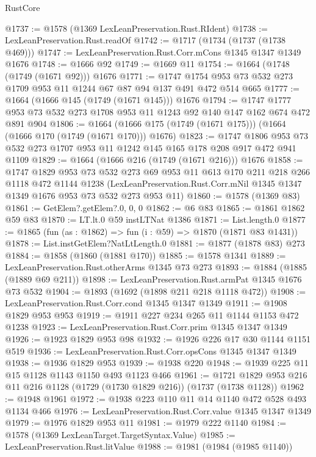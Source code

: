 \begin{lexlean}{RustCore}
\begin{coremodule}
@1737 := @1578 (@1369 LexLeanPreservation.Rust.RIdent)
@1738 := LexLeanPreservation.Rust.readOf
@1742 := @1717 (@1734 (@1737 (@1738 @469)))
@1747 := LexLeanPreservation.Rust.Corr.mCons @1345 @1347 @1349 @1676
@1748 := @1666 @92
@1749 := @1669 @11
@1754 := @1664 (@1748 (@1749 (@1671 @92))) @1676
@1771 := @1747 @1754 @953 @73 @532 @273 @1709 @953 @11 @1244 @67 @87 @94 @137 @491 @472 @514 @665
@1777 := @1664 (@1666 @145 (@1749 (@1671 @145))) @1676
@1794 := @1747 @1777 @953 @73 @532 @273 @1708 @953 @11 @1243 @92 @140 @147 @162 @674 @472 @891 @904
@1806 := @1664 (@1666 @175 (@1749 (@1671 @175))) (@1664 (@1666 @170 (@1749 (@1671 @170))) @1676)
@1823 := @1747
    @1806
    @953
    @73
    @532
    @273
    @1707
    @953
    @11
    @1242
    @145
    @165
    @178
    @208
    @917
    @472
    @941
    @1109
@1829 := @1664 (@1666 @216 (@1749 (@1671 @216))) @1676
@1858 := @1747
    @1829
    @953
    @73
    @532
    @273
    @69
    @953
    @11
    @613
    @170
    @211
    @218
    @266
    @1118
    @472
    @1144
    @1238
    (LexLeanPreservation.Rust.Corr.mNil @1345 @1347 @1349 @1676 @953 @73 @532 @273 @953 @11)
@1860 := @1578 (@1369 @83)
@1861 := GetElem?.getElem?.{0, 0, 0}
@1862 := @6 @83
@1865 := @1861 @1862 @59 @83
@1870 := LT.lt.{0} @59 instLTNat @1386
@1871 := List.length.{0}
@1877 := @1865 (fun (as : @1862) => fun (i : @59) => @1870 (@1871 @83 @1431))
@1878 := List.instGetElem?NatLtLength.{0}
@1881 := @1877 (@1878 @83) @273
@1884 := @1858 (@1860 (@1881 @170))
@1885 := @1578 @1341
@1889 := LexLeanPreservation.Rust.otherArms @1345 @73 @273
@1893 := @1884 (@1885 (@1889 @69 @211))
@1898 := LexLeanPreservation.Rust.armPat @1345 @1676 @73 @532
@1904 := @1893 (@1692 (@1898 @211 @218 @1118 @472))
@1908 := LexLeanPreservation.Rust.Corr.cond @1345 @1347 @1349
@1911 := @1908 @1829 @953 @953
@1919 := @1911 @227 @234 @265 @11 @1144 @1153 @472 @1238
@1923 := LexLeanPreservation.Rust.Corr.prim @1345 @1347 @1349
@1926 := @1923 @1829 @953 @98
@1932 := @1926 @226 @17 @30 @1144 @1151 @519
@1936 := LexLeanPreservation.Rust.Corr.opsCons @1345 @1347 @1349
@1938 := @1936 @1829 @953
@1939 := @1938 @220
@1948 := @1939 @225 @11 @15 @1128 @1143 @1150 @493 @1123 @466
@1961 := @1721 @1829 @953 @216 @11 @216 @1128 (@1729 (@1730 @1829 @216)) (@1737 (@1738 @1128))
@1962 := @1948 @1961
@1972 := @1938 @223 @110 @11 @14 @1140 @472 @528 @493 @1134 @466
@1976 := LexLeanPreservation.Rust.Corr.value @1345 @1347 @1349
@1979 := @1976 @1829 @953 @11
@1981 := @1979 @222 @1140
@1984 := @1578 (@1369 LexLeanTarget.TargetSyntax.Value)
@1985 := LexLeanPreservation.Rust.litValue
@1988 := @1981 (@1984 (@1985 @1140))

\end{coremodule}
\end{lexlean}
